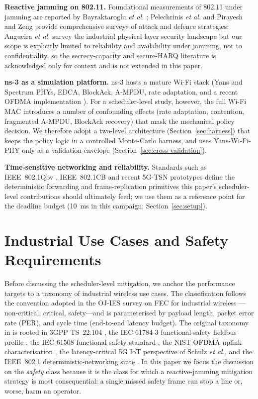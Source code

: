 \documentclass[journal,onecolumn,11pt,a4paper]{IEEEtran}
\begin{document}
\textbf{Reactive jamming on 802.11.} Foundational measurements of
802.11 under jamming are reported by Bayraktaroglu \emph{et al.}\xspace
\cite{Bay08,Bay13}; Pelechrinis \emph{et al.}\xspace \cite{Pel11} and Pirayesh
and Zeng \cite{Gri21} provide comprehensive surveys of attack and
defence strategies; Angueira \emph{et al.}\xspace \cite{Ang22} survey the
industrial physical-layer security landscape but our scope is
explicitly limited to reliability and availability under jamming,
not to confidentiality, so the secrecy-capacity and secure-HARQ
literature \cite{Tan09,Blo08,Blo11} is acknowledged only for
context and is not extended in this paper.

\textbf{ns-3 as a simulation platform.} ns-3 \cite{HLR08,LH06} hosts a
mature Wi-Fi stack (Yans and Spectrum PHYs, EDCA, BlockAck, A-MPDU,
rate adaptation, and a recent OFDMA implementation
\cite{Mag21}). For a scheduler-level study, however, the full Wi-Fi
MAC introduces a number of confounding effects (rate adaptation,
contention, fragmented A-MPDU, BlockAck recovery) that mask the
mechanical policy decision. We therefore adopt a two-level architecture
(Section~\ref{sec:harness}) that keeps the policy logic in a
controlled Monte-Carlo harness, and uses Yans-Wi-Fi-PHY only as a
validation envelope (Section~\ref{sec:cross-validation}).

\textbf{Time-sensitive networking and reliability.} Standards such as
IEEE~802.1Qbv \cite{IEEE802Qbv}, IEEE~802.1CB \cite{IEEE802CB} and
recent 5G-TSN prototypes \cite{TSN5G25} define the deterministic
forwarding and frame-replication primitives this paper's scheduler-level
contributions should ultimately feed; we use them as a reference point
for the deadline budget (\SI{10}{ms} in this campaign;
Section~\ref{sec:setup}).

\section{Industrial Use Cases and Safety Requirements}
\label{sec:usecases}

Before discussing the scheduler-level mitigation, we anchor the
performance targets to a taxonomy of industrial wireless use cases.
The classification follows the convention adopted in the OJ-IES survey
on FEC for industrial wireless \cite{Fan22}---non-critical, critical,
safety---and is parameterised by payload length, packet error rate
(PER), and cycle time (end-to-end latency budget). The original
taxonomy in \cite{Fan22} is rooted in 3GPP TS~22.104
\cite{TS22104}, the IEC 61784-3 functional-safety fieldbus profile
\cite{IEC61784}, the IEC 61508 functional-safety standard
\cite{IEC61508,Gal08}, the NIST OFDMA uplink characterisation
\cite{Mon24}, the latency-critical 5G IoT perspective of Schulz
\emph{et al.}\xspace \cite{Sch17}, and the IEEE~802.1 deterministic-networking
suite \cite{IEEE802Qbv,IEEE802CB}. In this paper we focus the
discussion on the \emph{safety} class because it is the class for
which a reactive-jamming mitigation strategy is most consequential:
a single missed safety frame can stop a line or, worse, harm an
operator.
\end{document}
